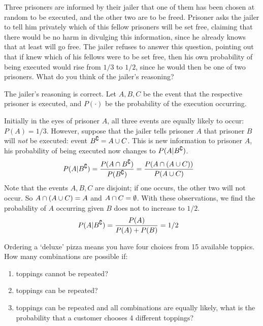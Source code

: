 \documentclass{article}
\begin{document}
    \newpage

    \begin{problem}
        Three prisoners are informed by their jailer that one of them has been chosen at random to be executed, and the other two are to be freed. Prisoner \A{} asks the jailer to tell him privately which of this fellow prisoners will be set free, claiming that there would be no harm in divulging this information, since he already knows that at least will go free. The jailer refuses to answer this question, pointing out that if \A{} knew which of his fellows were to be set free, then his own probability of being executed would rise from $1/3$ to $1/2$, since he would then be one of two prisoners. What do you think of the jailer's reasoning?
    \end{problem}
    
    \begin{solution}
        The jailer's reasoning is correct. Let $A, B, C$ be the event that the respective prisoner is executed, and $P(\cdot)$ be the probability of the execution occurring. 

        Initially in the eyes of prisoner $A$, all three events are equally likely to occur: $P(A) = 1/3$. However, suppose that the jailer tells prisoner $A$ that prisoner $B$ will \emph{not} be executed: event $B^{\complement} = A \cup C$. This is new information to prisoner $A$, his probability of being executed now changes to $P(A | B^{\complement})$.
        \begin{align*}
            P(A | B^{\complement}) &= \frac{P(A \cap B^{\complement})} {P(B^{\complement})} 
            = \frac{P(A \cap (A \cup C))} {P(A \cup C)}
        \end{align*}
        Note that the events $A, B, C$ are disjoint; if one occurs, the other two will not occur. So $A \cap (A \cup C) = A$ and $A \cap C = \emptyset$. With these observations, we find the probability of $A$ occurring given $B$ does not to increase to $1/2$.
        \begin{align}
            P(A | B^{\complement}) &= \frac{P(A)} {P(A) + P(B)} = 1/2
        \end{align}
    \end{solution}

    \nextproblem

    \begin{problem}
        Ordering a `deluxe' pizza means you have four choices from 15 available toppics. How many combinations are possible if:
        \begin{enumerate}[label=(\alph*)]
            \item toppings cannot be repeated?
            \item toppings can be repeated?
            \item toppings can be repeated and all combinations are equally likely, what is the probability that a customer chooses 4 different toppings?
        \end{enumerate}
    \end{problem}
\end{document}
